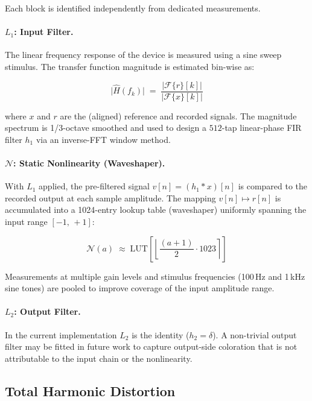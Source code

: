 \documentclass[11pt, letterpaper]{article}
\begin{document}
Each block is identified independently from dedicated measurements.

\paragraph{$L_1$: Input Filter.}
The linear frequency response of the device is measured using a sine sweep
stimulus.  The transfer function magnitude is estimated bin-wise as:

\begin{equation}
    \bigl|\hat{H}(f_k)\bigr| \;=\;
    \frac{\bigl|\mathcal{F}\{r\}[k]\bigr|}{\bigl|\mathcal{F}\{x\}[k]\bigr|}
    \label{eq:fr_estimate}
\end{equation}

where $x$ and $r$ are the (aligned) reference and recorded signals.
The magnitude spectrum is 1/3-octave smoothed and used to design a
$512$-tap linear-phase FIR filter $h_1$ via an inverse-FFT window method.

\paragraph{$\mathcal{N}$: Static Nonlinearity (Waveshaper).}
With $L_1$ applied, the pre-filtered signal $v[n] = (h_1 * x)[n]$ is
compared to the recorded output at each sample amplitude.  The mapping
$v[n] \mapsto r[n]$ is accumulated into a 1024-entry lookup table
(waveshaper) uniformly spanning the input range $[-1,\,+1]$:

\begin{equation}
    \mathcal{N}(a) \;\approx\; \text{LUT}\!\left[
        \left\lfloor \frac{(a + 1)}{2} \cdot 1023 \right\rceil
    \right]
    \label{eq:waveshaper}
\end{equation}

Measurements at multiple gain levels and stimulus frequencies (100\,Hz and
1\,kHz sine tones) are pooled to improve coverage of the input amplitude range.

\paragraph{$L_2$: Output Filter.}
In the current implementation $L_2$ is the identity ($h_2 = \delta$).
A non-trivial output filter may be fitted in future work to capture
output-side coloration that is not attributable to the input chain or
the nonlinearity.

\subsection{Total Harmonic Distortion}
\label{sec:thd}
\end{document}
